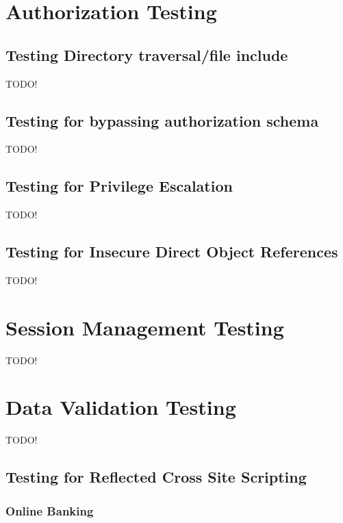 \clearpage

\section{Authorization Testing}

\subsection{Testing Directory traversal/file include}
TODO!
\subsection{Testing for bypassing authorization schema}
TODO!
\subsection{Testing for Privilege Escalation}
TODO!
\subsection{Testing for Insecure Direct Object References}
TODO!

\section{Session Management Testing}
TODO!

\section{Data Validation Testing}

TODO!

\subsection{Testing for Reflected Cross Site Scripting}
\subsubsection*{Online Banking}

